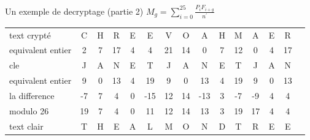 \documentclass[10pt,xcolor=table]{beamer}
\begin{document}
\begin{frame}

\begin{exampleblock}{Un exemple de decryptage (partie 2)} %
$M_{g} = \sum_{i=0}^{25} \frac{P_{i} F_{i+g}}{n^{'}}$\\ \pause
{} 
\tabcolsep=3pt
\begin{tabular}{l!{\vrule}cccccccccccccc} 
text crypté & C & H & R & E & E & V & O & A & H & M & A & E & R \pause \\  
equivalent entier & 2 & 7 & 17 & 4 & 4 & 21 & 14 & 0 & 7 & 12 & 0 & 4 & 17 \pause \\ 
cle & J & A & N &  E & T & J & A & N &  E & T & J & A & N  \pause  \\ 
equivalent entier & 9 & 0 & 13 & 4 & 19 & 9 & 0 & 13 & 4 & 19 & 9 & 0 & 13\pause \\ \hline
la difference & -7 & 7 & 4 & 0 & -15 & 12 & 14 & -13 & 3 & -7 & -9 & 4 & 4 \pause \\ \hline
modulo 26 & 19 & 7 & 4 & 0 & 11 & 12 & 14 & 13 & 3 & 19 & 17 & 4 & 4 \pause \\ \hline
text clair & T & H & E & A & L & M & O & N & D & T & R & E & E \pause \\
\end{tabular}
\end{exampleblock}
\end{frame}
\end{document}
